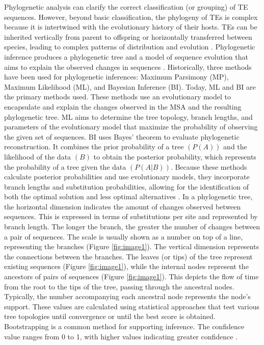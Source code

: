 \documentclass[unnumsec,webpdf,contemporary,large]{oup-authoring-template}%
\theoremstyle{thmstyleone}%
\theoremstyle{thmstyletwo}%
\theoremstyle{thmstylethree}%
\begin{document}
Phylogenetic analysis can clarify the correct classification (or grouping) of TE sequences. However, beyond basic classification, the phylogeny of TEs is complex because it is intertwined with the evolutionary history of their hosts. TEs can be inherited vertically from parent to offspring or horizontally transferred between species, leading to complex patterns of distribution and evolution \cite{wells_field_2020}. Phylogenetic inference produces a phylogenetic tree and a model of sequence evolution that aims to explain the observed changes in sequences \cite{yang_molecular_2014}. Historically, three methods have been used for phylogenetic inferences: Maximum Parsimony (MP), Maximum Likelihood (ML), and Bayesian Inference (BI). Today, ML and BI are the primary methods used. These methods use an evolutionary model to encapsulate and explain the changes observed in the MSA and the resulting phylogenetic tree. ML aims to determine the tree topology, branch lengths, and parameters of the evolutionary model that maximize the probability of observing the given set of sequences. BI uses Bayes' theorem to evaluate phylogenetic reconstruction. It combines the prior probability of a tree $(P(A))$ and the likelihood of the data $(B)$ to obtain the posterior probability, which represents the probability of a tree given the data $(P(A|B))$. Because these methods calculate posterior probabilities and use evolutionary models, they incorporate branch lengths and substitution probabilities, allowing for the identification of both the optimal solution and less optimal alternatives \cite{yang_molecular_2014,selberg_ancestral_2021,thornton_resurrecting_2004,scossa_ancestral_2021,ayuso-fernandez_ancestral_2022,nascimento_biologists_2017,huelsenbeck_bayesian_2001}. In a phylogenetic tree, the horizontal dimension indicates the amount of changes observed between sequences. This is expressed in terms of substitutions per site and represented by branch length. The longer the branch, the greater the number of changes between a pair of sequences. The scale is usually shown as a number on top of a line, representing the branches (Figure \ref{fig:image1}). The vertical dimension represents the connections between the branches. The leaves (or tips) of the tree represent existing sequences (Figure \ref{fig:image1}), while the internal nodes represent the ancestors of pairs of sequences (Figure \ref{fig:image1}). This depicts the flow of time from the root to the tips of the tree, passing through the ancestral nodes. Typically, the number accompanying each ancestral node represents the node's support. These values are calculated using statistical approaches that test various tree topologies until convergence or until the best score is obtained. Bootstrapping is a common method for supporting inference. The confidence value ranges from 0 to 1, with higher values indicating greater confidence \cite{yang_molecular_2014,anisimova_evolutionary_2019}.
\end{document}
